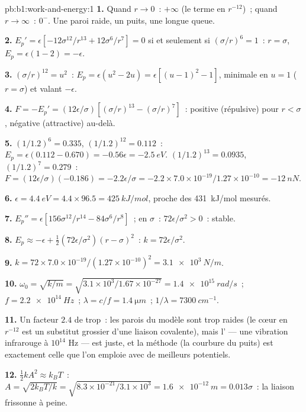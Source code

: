 \begin{solution}{pb:b1:work-and-energy:1}
\textbf{1.} Quand $r \to 0$~: $+\infty$ (le terme en $r^{-12}$)~; quand $r \to \infty$~:
$0^-$. Une paroi raide, un puits, une longue queue.

\textbf{2.} $E_p' = \epsilon[-12\sigma^{12}/r^{13} + 12\sigma^6/r^7] = 0$ si et seulement si
$(\sigma/r)^6 = 1$~: $r = \sigma$, $E_p = \epsilon(1 - 2) = -\epsilon$.

\textbf{3.} $(\sigma/r)^{12} = u^2$~: $E_p = \epsilon(u^2 - 2u) = \epsilon[(u - 1)^2
- 1]$, minimale en $u = 1$ ($r = \sigma$) et valant $-\epsilon$.

\textbf{4.} $F = -E_p' = (12\epsilon/\sigma)[(\sigma/r)^{13} - (\sigma/r)^7]$~:
positive (répulsive) pour $r < \sigma$, négative (attractive) au-delà.

\textbf{5.} $(1/1.2)^6 = 0.335$, $(1/1.2)^{12} = 0.112$~: $E_p = \epsilon(0.112
- 0.670) = -0.56\epsilon = \qty{-2.5}{eV}$. $(1/1.2)^{13} = 0.0935$,
$(1/1.2)^7 = 0.279$~: $F = (12\epsilon/\sigma)(-0.186) = -2.2\epsilon/\sigma =
-2.2 \times 7.0\times10^{-19}/1.27\times10^{-10} = \qty{-12}{nN}$.

\textbf{6.} $\epsilon = \qty{4.4}{eV} = 4.4 \times 96.5 = \qty{425}{kJ/mol}$,
proche des \qty{431}{kJ/mol} mesurés.

\textbf{7.} $E_p'' = \epsilon[156\sigma^{12}/r^{14} - 84\sigma^6/r^8]$~; en
$\sigma$~: $72\epsilon/\sigma^2 > 0$~: stable.

\textbf{8.} $E_p \approx -\epsilon + \tfrac12(72\epsilon/\sigma^2)(r - \sigma)^2$~:
$k = 72\epsilon/\sigma^2$.

\textbf{9.} $k = 72 \times 7.0\times10^{-19}/(1.27\times10^{-10})^2 =
\qty{3.1e3}{N/m}$.

\textbf{10.} $\omega_0 = \sqrt{k/m} = \sqrt{3.1\times10^3/1.67\times10^{-27}} =
\qty{1.4e15}{rad/s}$~; $f = \qty{2.2e14}{Hz}$~; $\lambda = c/f = \qty{1.4}{\micro m}$~;
$1/\lambda = \qty{7300}{cm^{-1}}$.

\textbf{11.} Un facteur $2.4$ de trop~: les parois du modèle sont trop
raides (le cœur en $r^{-12}$ est un substitut grossier d'une liaison
covalente), mais l' --- une vibration infrarouge à
$10^{14}$ Hz --- est juste, et la méthode (la courbure du puits) est
exactement celle que l'on emploie avec de meilleurs potentiels.

\textbf{12.} $\tfrac12 kA^2 \approx k_BT$~: $A = \sqrt{2k_BT/k} = \sqrt{8.3\times
10^{-21}/3.1\times10^3} = \qty{1.6e-12}{m} = 0.013\sigma$~: la liaison
frissonne à peine.


\end{solution}
